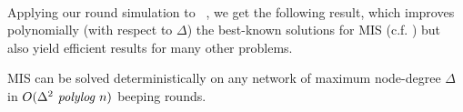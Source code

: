 {\paragraph{}
Applying our \congest round simulation to~\cite{ghaffari2021improved}%
, we get the following result, which improves polynomially (with respect to $\Delta$) the best-known solutions 
for MIS (c.f. \cite{beauquier2018fast})  but also yield efficient results for many other problems.




\begin{corollary}
\label{cor:mis}
MIS can be solved deterministically on any network of maximum node-degree $\Delta$ in $O(\Delta^2 \text{\em\ polylog } n)$ beeping rounds.
\end{corollary}


}
